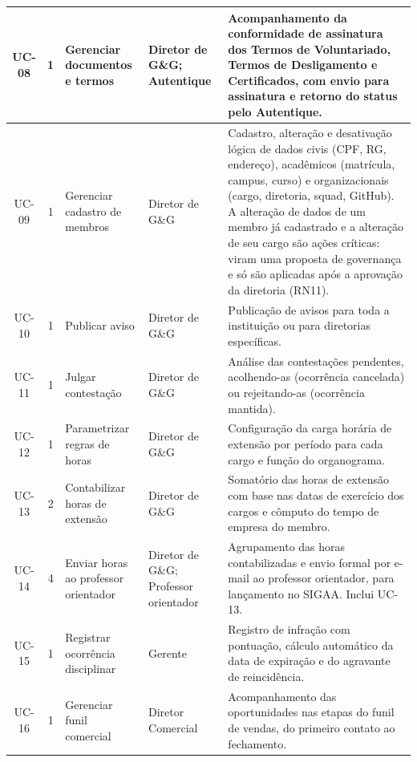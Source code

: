 \begin{center}
\begin{longtable}{|c|c|p{2.9cm}|p{2.4cm}|p{5.3cm}|}
UC-08 & 1 & Gerenciar documentos e termos & Diretor de G\&G; Autentique & Acompanhamento da conformidade de assinatura dos Termos de Voluntariado, Termos de Desligamento e Certificados, com envio para assinatura e retorno do status pelo Autentique. \\
\hline

UC-09 & 1 & Gerenciar cadastro de membros & Diretor de G\&G & Cadastro, alteração e desativação lógica de dados civis (CPF, RG, endereço), acadêmicos (matrícula, campus, curso) e organizacionais (cargo, diretoria, squad, GitHub). A alteração de dados de um membro já cadastrado e a alteração de seu cargo são ações críticas: viram uma proposta de governança e só são aplicadas após a aprovação da diretoria (RN11). \\
\hline

UC-10 & 1 & Publicar aviso & Diretor de G\&G & Publicação de avisos para toda a instituição ou para diretorias específicas. \\
\hline

UC-11 & 1 & Julgar contestação & Diretor de G\&G & Análise das contestações pendentes, acolhendo-as (ocorrência cancelada) ou rejeitando-as (ocorrência mantida). \\
\hline

UC-12 & 1 & Parametrizar regras de horas & Diretor de G\&G & Configuração da carga horária de extensão por período para cada cargo e função do organograma. \\
\hline

UC-13 & 2 & Contabilizar horas de extensão & Diretor de G\&G & Somatório das horas de extensão com base nas datas de exercício dos cargos e cômputo do tempo de empresa do membro. \\
\hline

UC-14 & 4 & Enviar horas ao professor orientador & Diretor de G\&G; Professor orientador & Agrupamento das horas contabilizadas e envio formal por e-mail ao professor orientador, para lançamento no SIGAA. Inclui UC-13. \\
\hline

UC-15 & 1 & Registrar ocorrência disciplinar & Gerente & Registro de infração com pontuação, cálculo automático da data de expiração e do agravante de reincidência. \\
\hline

UC-16 & 1 & Gerenciar funil comercial & Diretor Comercial & Acompanhamento das oportunidades nas etapas do funil de vendas, do primeiro contato ao fechamento. \\
\hline


\end{longtable}
\end{center}
